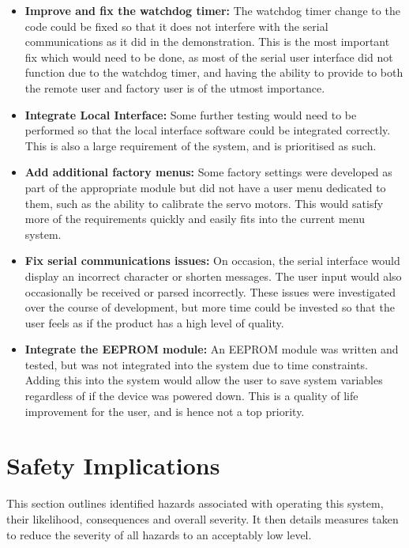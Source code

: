 \documentclass[]{report}
\begin{document}
\begin{itemize}
\item \textbf{Improve and fix the watchdog timer:} The watchdog timer change to the code could be fixed so that it does not interfere with the serial communications as it did in the demonstration. This is the most important fix which would need to be done, as most of the serial user interface did not function due to the watchdog timer, and having the ability to provide to both the remote user and factory user is of the utmost importance.

\item \textbf{Integrate Local Interface:} Some further testing would need to be performed so that the local interface software could be integrated correctly. This is also a large requirement of the system, and is prioritised as such.

\item \textbf{Add additional factory menus:} Some factory settings were developed as part of the appropriate module but did not have a user menu dedicated to them, such as the ability to calibrate the servo motors. This would satisfy more of the requirements quickly and easily fits into the current menu system.\

\item \textbf{Fix serial communications issues:} On occasion, the serial interface would display an incorrect character or shorten messages. The user input would also occasionally be received or parsed incorrectly. These issues were investigated over the course of development, but more time could be invested so that the user feels as if the product has a high level of quality.


\item \textbf{Integrate the EEPROM module:} An EEPROM module was written and tested, but was not integrated into the system due to time constraints. Adding this into the system would allow the user to save system variables regardless of if the device was powered down. This is a quality of life improvement for the user, and is hence not a top priority.
\end{itemize}

\chapter{Safety Implications}
This section outlines identified hazards associated with operating this system, their likelihood, consequences and overall severity. It then details measures taken to reduce the severity of all hazards to an acceptably low level.
\end{document}

